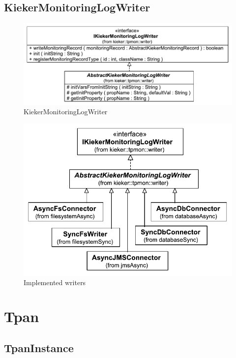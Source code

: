 \documentclass[12pt,journal,a4paper,twocolumn,final,oneside]{IEEEtran}%
\begin{document}
\subsection{KiekerMonitoringLogWriter}

\begin{figure}[h]\centering
\includegraphics[scale=0.55]{figures/model/kieker_KiekerMonitoringLogWriter}%
\caption{KiekerMonitoringLogWriter}
\end{figure}

\begin{figure}[h]\centering
\includegraphics[scale=0.55]{figures/model/kieker_writerimpls}%
\caption{Implemented writers}
\end{figure}

\section{Tpan}

\subsection{TpanInstance}
\end{document}
